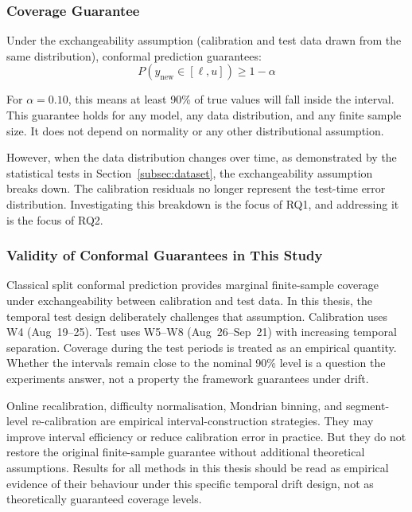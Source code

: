 \documentclass[12pt, a4paper, oneside]{report}
\begin{document}
\subsubsection{Coverage Guarantee}

Under the exchangeability assumption (calibration and test data drawn from the same distribution), conformal prediction guarantees:
\begin{equation}
    P(y_{\text{new}} \in [\ell, u]) \geq 1 - \alpha
    \label{eq:coverage_guarantee}
\end{equation}

For $\alpha = 0.10$, this means at least 90\% of true values will fall inside the interval. This guarantee holds for any model, any data distribution, and any finite sample size. It does not depend on normality or any other distributional assumption.

However, when the data distribution changes over time, as demonstrated by the statistical tests in Section~\ref{subsec:dataset}, the exchangeability assumption breaks down. The calibration residuals no longer represent the test-time error distribution. Investigating this breakdown is the focus of RQ1, and addressing it is the focus of RQ2.

\subsubsection{Validity of Conformal Guarantees in This Study}
\label{subsubsec:guarantee_validity}

Classical split conformal prediction provides marginal finite-sample coverage under exchangeability between calibration and test data. In this thesis, the temporal test design deliberately challenges that assumption. Calibration uses W4 (Aug~19--25). Test uses W5--W8 (Aug~26--Sep~21) with increasing temporal separation. Coverage during the test periods is treated as an empirical quantity. Whether the intervals remain close to the nominal 90\% level is a question the experiments answer, not a property the framework guarantees under drift.

Online recalibration, difficulty normalisation, Mondrian binning, and segment-level re-calibration are empirical interval-construction strategies. They may improve interval efficiency or reduce calibration error in practice. But they do not restore the original finite-sample guarantee without additional theoretical assumptions. Results for all methods in this thesis should be read as empirical evidence of their behaviour under this specific temporal drift design, not as theoretically guaranteed coverage levels.
\end{document}
